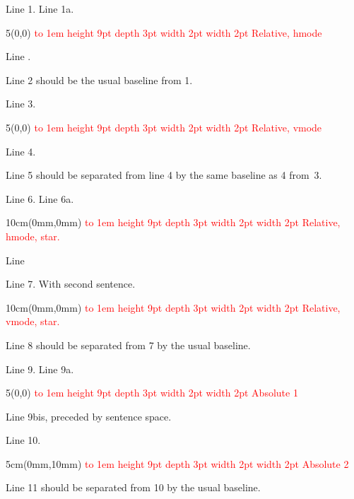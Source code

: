 \documentclass{article}
\def\content#1{\noindent
  \textcolor{Red}{\hbox to 1em{%
      \vrule height 9pt depth 3pt width 2pt %
      \hss
      \vrule width 2pt }\relax
    #1}}
\begin{document}

Line 1.  Line 1a.               %
\begin{textblock}{5}(0,0)
\content{Relative, hmode}
\end{textblock}
Line . %

Line 2 should be the usual baseline from 1.

\vskip 1cm

Line 3.

\begin{textblock}{5}(0,0)
\content{Relative, vmode}
\end{textblock}

Line 4.

Line 5 should be separated from line 4 by the same baseline as 4 from~3.

Line 6. Line 6a.
\begin{textblock*}{10cm}(0mm,0mm)
\content{Relative, hmode, star.}
\end{textblock*}
Line 

Line 7. With second sentence.

\begin{textblock*}{10cm}(0mm,0mm)
\content{Relative, vmode, star.}
\end{textblock*}

Line 8 should be separated from 7 by the usual baseline.

\newpage
{}

Line 9. Line 9a.
\begin{textblock}{5}(0,0)
\content{Absolute 1}
\end{textblock}
Line 9bis, preceded by sentence space.  %

Line 10.

\begin{textblock*}{5cm}(0mm,10mm)
\content{Absolute 2}
\end{textblock*}

Line 11 should be separated from 10 by the usual baseline.
\end{document}
